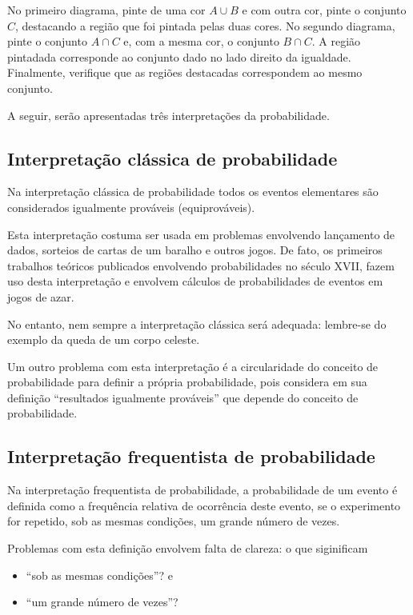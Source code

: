 No primeiro diagrama, pinte de uma cor \(A\cup B\) e com outra cor, pinte o conjunto \(C\), destacando a região que foi pintada pelas duas cores. No segundo diagrama, pinte o conjunto \(A\cap C\) e, com a mesma cor,  o conjunto \(B\cap C\). A região pintadada corresponde ao conjunto dado no lado direito da igualdade. Finalmente, verifique que as regiões destacadas correspondem ao mesmo conjunto.

A seguir, serão apresentadas três interpretações da probabilidade.


\subsection{Interpretação clássica de probabilidade}

Na interpretação clássica de probabilidade todos os eventos elementares são considerados igualmente prováveis (equiprováveis).

Esta interpretação costuma ser usada em problemas envolvendo lançamento de dados,  sorteios de cartas de um baralho e outros jogos. De fato, os primeiros trabalhos teóricos publicados envolvendo probabilidades no século XVII, fazem uso desta interpretação e envolvem cálculos de probabilidades de eventos em jogos de azar.

No entanto, nem sempre a interpretação clássica será adequada: lembre-se do exemplo da queda de um corpo celeste.

Um outro problema com esta interpretação é a circularidade do conceito de probabilidade para definir a própria probabilidade, pois considera em sua definição “resultados igualmente prováveis” que depende do conceito de probabilidade.


\subsection{Interpretação frequentista de probabilidade}

Na interpretação frequentista de probabilidade, a probabilidade de um evento é definida como a frequência relativa de ocorrência deste evento, se o experimento for repetido, sob as mesmas condições, um grande número de vezes.

Problemas com esta definição envolvem falta de clareza: o que siginificam
\begin{itemize}
\item {} 
“sob as mesmas condições”? e

\item {} 
“um grande número de vezes”?

\end{itemize}


